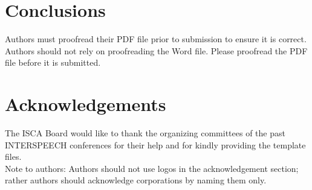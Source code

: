\documentclass[a4paper]{article}
\begin{document}
\section{Conclusions}

Authors must proofread their PDF file prior to submission to ensure it is correct. Authors should not rely on proofreading the Word file. Please proofread the PDF file before it is submitted.

\section{Acknowledgements}

The ISCA Board would like to thank the organizing committees of the past INTERSPEECH conferences for their help and for kindly providing the template files. \\
Note to authors: Authors should not use logos in the acknowledgement section; rather authors should acknowledge corporations by naming them only.






\end{document}
